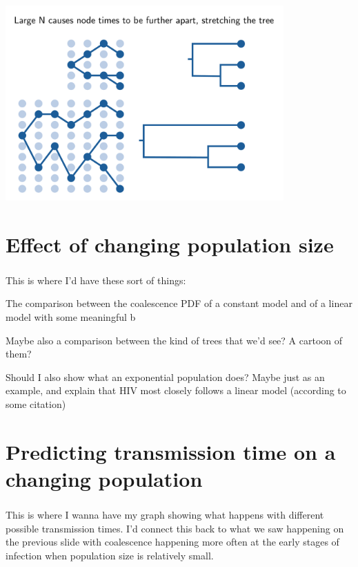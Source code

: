 \documentclass[aspectratio=169]{beamer}
\begin{document}
\begin{frame} \frametitle{\insertsection}

        \centering\includegraphics[width=0.8\textwidth]{images/coalescence}

\end{frame}

\section{Effect of changing population size}

\begin{frame} \frametitle{\insertsection}

    This is where I'd have these sort of things:

    The comparison between the coalescence PDF of a constant model
    and of a linear model with some meaningful b

    Maybe also a comparison between the kind of trees that we'd see?
    A cartoon of them?

    Should I also show what an exponential population does?
    Maybe just as an example, and explain that HIV most closely
    follows a linear model (according to some citation)

\end{frame}

\section{Predicting transmission time on a changing population}

\begin{frame} \frametitle{\insertsection}

    This is where I wanna have my graph showing what happens 
    with different possible transmission times. I'd connect this
    back to what we saw happening on the previous slide with 
    coalescence happening more often at the early stages of infection
    when population size is relatively small.
    
\end{frame}
\end{document}
